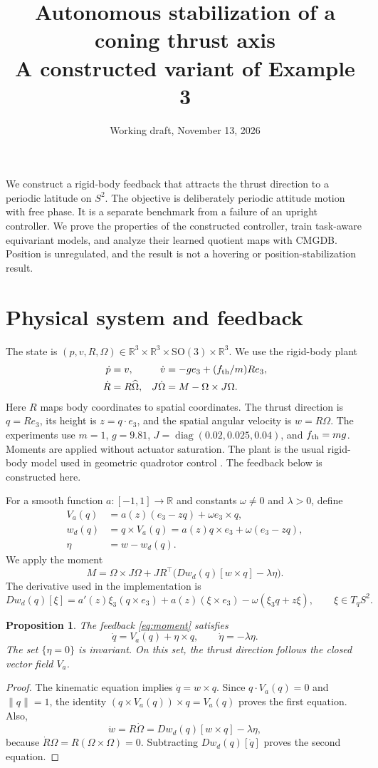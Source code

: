 \documentclass[11pt]{article}
\title{Autonomous stabilization of a coning thrust axis\\\large A constructed variant of Example 3}
\author{}
\date{Working draft, November 13, 2026}
\newtheorem{proposition}{Proposition}
\newcommand{\R}{\mathbb R}
\newcommand{\SO}{\mathrm{SO}}
\begin{document}
\maketitle
\noindent We construct a rigid-body feedback that attracts the thrust direction to a periodic latitude on $S^2$. The objective is deliberately periodic attitude motion with free phase. It is a separate benchmark from a failure of an upright controller. We prove the properties of the constructed controller, train task-aware equivariant models, and analyze their learned quotient maps with CMGDB. Position is unregulated, and the result is not a hovering or position-stabilization result.

\section{Physical system and feedback}
The state is $(p,v,R,\Omega)\in\R^3\times\R^3\times\SO(3)\times\R^3$. We use the rigid-body plant
\begin{align*}
 \dot p&=v,& \dot v&=-g e_3+(f_{\rm th}/m)Re_3,\\
 \dot R&=R\widehat\Omega,& J\dot\Omega&=M-\Omega\times J\Omega.
\end{align*}
Here $R$ maps body coordinates to spatial coordinates. The thrust direction is $q=Re_3$, its height is $z=q\cdot e_3$, and the spatial angular velocity is $w=R\Omega$. The experiments use $m=1$, $g=9.81$, $J=\operatorname{diag}(0.02,0.025,0.04)$, and $f_{\rm th}=mg$. Moments are applied without actuator saturation. The plant is the usual rigid-body model used in geometric quadrotor control \cite{lee,kousik}. The feedback below is constructed here.

For a smooth function $a\colon[-1,1]\to\R$ and constants $\omega\ne0$ and $\lambda>0$, define
\begin{align*}
 V_a(q)&=a(z)(e_3-zq)+\omega e_3\times q,\\
 w_d(q)&=q\times V_a(q)=a(z)q\times e_3+\omega(e_3-zq),\\
 \eta&=w-w_d(q).
\end{align*}
We apply the moment
\begin{equation}\label{eq:moment}
 M=\Omega\times J\Omega+JR^\top\bigl(Dw_d(q)[w\times q]-\lambda\eta\bigr).
\end{equation}
The derivative used in the implementation is
\[
 Dw_d(q)[\xi]=a'(z)\xi_3(q\times e_3)+a(z)(\xi\times e_3)-\omega(\xi_3q+z\xi),\qquad \xi\in T_qS^2.
\]

\begin{proposition}\label{prop:error}
The feedback \eqref{eq:moment} satisfies
\[
 \dot q=V_a(q)+\eta\times q,\qquad \dot\eta=-\lambda\eta.
\]
The set $\{\eta=0\}$ is invariant. On this set, the thrust direction follows the closed vector field $V_a$.
\end{proposition}
\begin{proof}
The kinematic equation implies $\dot q=w\times q$. Since $q\cdot V_a(q)=0$ and $\|q\|=1$, the identity $(q\times V_a(q))\times q=V_a(q)$ proves the first equation. Also,
\[
 \dot w=R\dot\Omega=Dw_d(q)[w\times q]-\lambda\eta,
\]
because $\dot R\Omega=R(\Omega\times\Omega)=0$. Subtracting $Dw_d(q)[\dot q]$ proves the second equation.
\end{proof}
\end{document}
